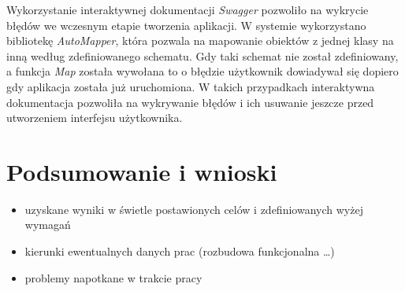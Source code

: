 \documentclass[a4paper,twoside,12pt]{book}
\begin{document}
Wykorzystanie interaktywnej dokumentacji \textit{Swagger} pozwoliło na wykrycie błędów we wczesnym etapie tworzenia aplikacji. W systemie wykorzystano bibliotekę \textit{AutoMapper}, która pozwala na mapowanie obiektów z jednej klasy na inną według zdefiniowanego schematu. Gdy taki schemat nie został zdefiniowany, a funkcja \textit{Map} została wywołana to o błędzie użytkownik dowiadywał się dopiero gdy aplikacja została już uruchomiona. W takich przypadkach interaktywna dokumentacja pozwoliła na wykrywanie błędów i ich usuwanie jeszcze przed utworzeniem interfejsu użytkownika.

\chapter{Podsumowanie i wnioski}
\begin{itemize}
\item uzyskane wyniki w świetle postawionych celów i zdefiniowanych wyżej wymagań
\item kierunki ewentualnych danych prac (rozbudowa funkcjonalna …)
\item problemy napotkane w trakcie pracy
\end{itemize}
 


\end{document}
